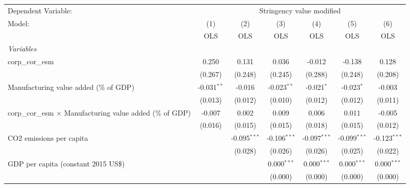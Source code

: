 
\begingroup
\centering
\begin{tabular}{lcccccc}
   \toprule
   Dependent Variable: & \multicolumn{6}{c}{Stringency value modified}\\
   Model:                                                            & (1)           & (2)            & (3)            & (4)            & (5)            & (6)\\  
                                                                     &  OLS          & OLS            & OLS            & OLS            & OLS            & OLS\\  
   \midrule
   \emph{Variables}\\
   corp\_cor\_esm                                                    & 0.250         & 0.131          & 0.036          & -0.012         & -0.138         & 0.128\\   
                                                                     & (0.267)       & (0.248)        & (0.245)        & (0.288)        & (0.248)        & (0.208)\\   
   Manufacturing value added (\% of GDP)                             & -0.031$^{**}$ & -0.016         & -0.023$^{**}$  & -0.021$^{*}$   & -0.023$^{*}$   & -0.003\\   
                                                                     & (0.013)       & (0.012)        & (0.010)        & (0.012)        & (0.012)        & (0.011)\\   
   corp\_cor\_esm $\times$ Manufacturing value added (\% of GDP)     & -0.007        & 0.002          & 0.009          & 0.006          & 0.011          & -0.005\\   
                                                                     & (0.016)       & (0.015)        & (0.015)        & (0.018)        & (0.015)        & (0.012)\\   
   CO2 emissions per capita                                          &               & -0.095$^{***}$ & -0.106$^{***}$ & -0.097$^{***}$ & -0.099$^{***}$ & -0.123$^{***}$\\   
                                                                     &               & (0.028)        & (0.026)        & (0.026)        & (0.025)        & (0.022)\\   
   GDP per capita (constant 2015 US\$)                               &               &                & 0.000$^{***}$  & 0.000$^{***}$  & 0.000$^{***}$  & 0.000$^{***}$\\   
                                                                     &               &                & (0.000)        & (0.000)        & (0.000)        & (0.000)\\   

\end{tabular}
